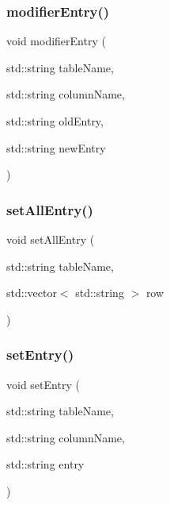 \mbox{\label{entry_8hpp_ab254b5514a4950c7479bc4d513c438dc}} 
\subsubsection{modifier\+Entry()}
{\footnotesize\ttfamily void modifier\+Entry (\begin{DoxyParamCaption}\item[{std\+::string}]{table\+Name,  }\item[{std\+::string}]{column\+Name,  }\item[{std\+::string}]{old\+Entry,  }\item[{std\+::string}]{new\+Entry }\end{DoxyParamCaption})}

\mbox{\label{entry_8hpp_aeb45ccd70b8692b592754a0886c2d109}} 
\subsubsection{set\+All\+Entry()}
{\footnotesize\ttfamily void set\+All\+Entry (\begin{DoxyParamCaption}\item[{std\+::string}]{table\+Name,  }\item[{std\+::vector$<$ std\+::string $>$}]{row }\end{DoxyParamCaption})}

\mbox{\label{entry_8hpp_a1faab165d9a7dc43808e1a0075e007f9}} 
\subsubsection{set\+Entry()}
{\footnotesize\ttfamily void set\+Entry (\begin{DoxyParamCaption}\item[{std\+::string}]{table\+Name,  }\item[{std\+::string}]{column\+Name,  }\item[{std\+::string}]{entry }\end{DoxyParamCaption})}

